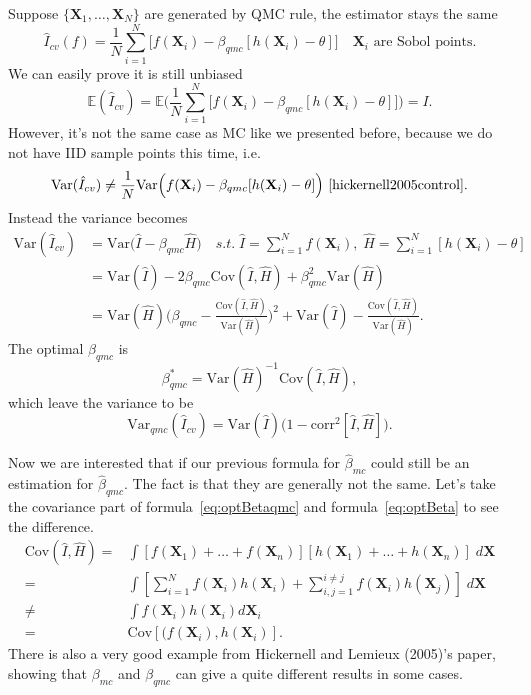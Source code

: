 Suppose $\{\mathbf{X}_1, \dots, \mathbf{X}_N\}$ are generated by QMC rule, the estimator stays the same
\[
    \hat{I}_{cv}(f)=\frac{1}{N}\sum_{i=1}^{N}\Big[ f(\mathbf{\mathbf{X}}_i)-\beta_{qmc}[h(\mathbf{X}_i)-\theta] \Big] \quad \mathbf{X}_i \text{ are Sobol points}.
\]
We can easily prove it is still unbiased
\[
\mathbb{E}(\hat{I}_{cv})=\mathbb{E}\Big(\frac{1}{N}\sum_{i=1}^{N}\Big[f(\mathbf{X}_i)-\beta_{qmc}[h(\mathbf{X}_i)-\theta] \Big] \Big)=I.
\]
However, it's not the same case as MC like we presented before, because we do not have IID sample points this time, i.e.
\[
    \mathrm{Var}(\hat{I}_{cv}) \not=\frac{1}{N}\mathrm{Var}\Big(f(\mathbf{X}_i)-\beta_{qmc}[h(\mathbf{X}_i)-\theta]\Big) \text{ \cite{hickernell2005control}}.
\]
Instead the variance becomes
\begin{align*}
    \mathrm{Var}(\hat{I}_{cv})  
    &=\mathrm{Var}\Big( \hat{I}- \beta_{qmc}\hat{H}\Big)
    \quad s.t.\; \hat{I}=\sum_{i=1}^{N}f(\mathbf{X}_i),\; \hat{H}=\sum_{i=1}^{N}[h(\mathbf{X}_i)-\theta]\\
    &=\mathrm{Var}(\hat{I})-2\beta_{qmc}\mathrm{Cov}(\hat{I},\hat{H})+\beta_{qmc}^2\mathrm{Var}(\hat{H})\\
    &=\mathrm{Var}(\hat{H})\Big(\beta_{qmc}-\frac{\mathrm{Cov}(\hat{I},\hat{H})}{\mathrm{Var}(\hat{H})}\Big)^2+\mathrm{Var}(\hat{I})-\frac{\mathrm{Cov}(\hat{I},\hat{H})}{\mathrm{Var}(\hat{H})}.
\end{align*}
The optimal $\beta_{qmc}$ is
\begin{equation}
    \beta_{qmc}^*= \mathrm{Var} (\hat{H})^{-1}\mathrm{Cov} (\hat{I}, \hat{H}),
    \label{eq:optBetaqmc}
\end{equation}
which leave the variance to be
\[
    \mathrm{Var}_{qmc}(\hat{I}_{cv})=\mathrm{Var}(\hat{I})\big(1-\mathrm{corr}^2[\hat{I}, \hat{H}]\big).
\]

Now we are interested that if our previous formula for $\hat{\beta}_{mc}$ could still be an estimation for $\hat{\beta}_{qmc}$. The fact is that they are generally not the same. Let's take the covariance part of formula~\eqref{eq:optBetaqmc} and formula~\eqref{eq:optBeta} to see the difference. 
\begin{align*}
    \mathrm{Cov}(\hat{I}, \hat{H})=&\int [f(\mathbf{X}_1)+\dots+f(\mathbf{X}_n)][h(\mathbf{X}_1)+\dots+h(\mathbf{X}_n)]\; d\mathbf{\mathbf{X}}\\
    =&\int [\sum_{i=1}^{N}f(\mathbf{X}_i)h(\mathbf{X}_i) + \sum_{i,j=1}^{i\neq j}f(\mathbf{X}_i)h(\mathbf{X}_j)]\; d\mathbf{\mathbf{X}}\\
    \neq&\int f(\mathbf{X}_i)h(\mathbf{X}_i)d\mathbf{X}_i\\
    =&\mathrm{Cov}[(f(\mathbf{X}_i),h(\mathbf{X}_i)].
\end{align*}
There is also a very good example from Hickernell and Lemieux (2005)\cite{hickernell2005control}'s paper, showing that $\beta_{mc}$ and $\beta_{qmc}$ can give a quite different results in some cases. 


